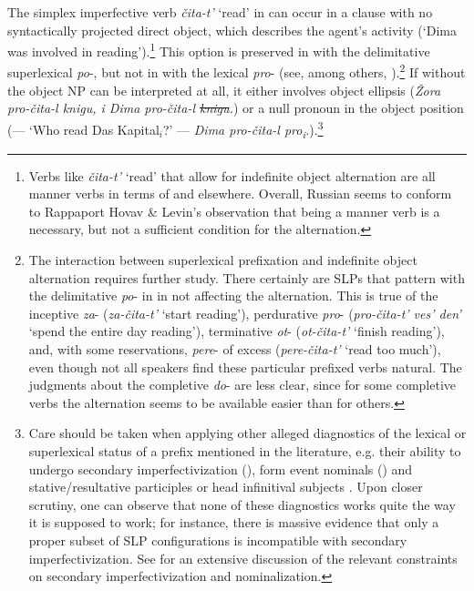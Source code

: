 \documentclass[output=paper,colorlinks,citecolor=brown]{langscibook}
\begin{document}
\noindent The simplex imperfective verb \textit{čita-t’} ‘read’ in  can occur in a clause with no syntactically projected direct object, which describes the agent’s activity (‘Dima was involved in reading’).\footnote{Verbs like \textit{čita-t’} ‘read’ that allow for indefinite object alternation are all manner verbs in terms of \citet{Rappaport.Hovav.Levin1998} and elsewhere. Overall, Russian seems to conform to Rappaport Hovav \& Levin’s observation that being a manner verb is a necessary, but not a sufficient condition for the alternation.}  This option is preserved in  with the delimitative superlexical \textit{po}-, but not in  with the lexical \textit{pro}- (see, among others, \citealt{BabkoMalaya1999,DimitrovaVulchanova1996}).\footnote{The interaction between superlexical prefixation and indefinite object alternation requires further study. There certainly are SLPs that pattern with the delimitative \textit{po}- in  in not affecting the alternation. This is true of the inceptive \textit{za}- (\textit{za-čita-t’} ‘start reading’), perdurative \textit{pro}- (\textit{pro-čita-t’ ves’ den’} ‘spend the entire day reading’), terminative \textit{ot}- (\textit{ot-čita-t’} ‘finish reading’), and, with some reservations, \textit{pere}- of excess (\textit{pere-čita-t’} ‘read too much’), even though not all speakers find these particular prefixed verbs natural. The judgments about the completive \textit{do}- are less clear, since for some completive verbs the alternation seems to be available easier than for others. %
} If  without the object NP can be interpreted at all, it either involves object ellipsis (\textit{Žora pro-čita-l knigu, i Dima pro-čita-l \sout{knigu}.}) or a null pronoun in the object position (— `Who read Das Kapital$_i$?' — \textit{Dima pro-čita-l \textit{pro\textsubscript{i}}.}).\footnote{Care should be taken when applying other alleged diagnostics of the lexical or superlexical status of a prefix mentioned in the literature, e.g. their ability to undergo secondary imperfectivization (\citealt{Ramchand2004,Gribanova2013}), form event nominals (\citealt{BabkoMalaya1999,Svenonius2004}) and stative/resultative participles or head infinitival subjects \citep[165]{Gehrke2008}.  Upon closer scrutiny, one can observe that none of these diagnostics works quite the way it is supposed to work; for instance, there is massive evidence that only a proper subset of SLP configurations is incompatible with secondary imperfectivization. See \citet{Tatevosov2013} for an extensive discussion of the relevant constraints on secondary imperfectivization and nominalization.}
\end{document}
